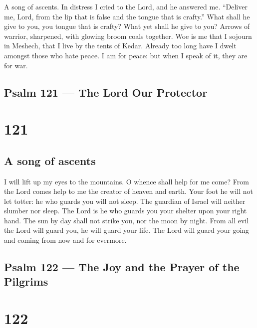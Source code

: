 A song of ascents.  In distress I cried to the Lord, and he
answered me.  ``Deliver me, Lord, from the lip that is false
and the tongue that is crafty.''  What shall he give to you,
you tongue that is crafty? What yet shall he give to you? 
Arrows of warrior, sharpened, with glowing broom coals together.
 Woe is me that I sojourn in Meshech, that I live by the
tents of Kedar.  Already too long have I dwelt amongst those
who hate peace.  I am for peace: but when I speak of it,
they are for war.

\hypertarget{psalm-121-the-lord-our-protector}{%
\subsection{Psalm 121 --- The Lord Our
Protector}\label{psalm-121-the-lord-our-protector}}

\hypertarget{section-120}{%
\section{121}\label{section-120}}

\hypertarget{a-song-of-ascents}{%
\subsection{A song of ascents}\label{a-song-of-ascents}}

 I will lift up my eyes to the mountains. O whence shall
help for me come?  From the Lord comes help to me the
creator of heaven and earth.  Your foot he will not let
totter: he who guards you will not sleep.  The guardian of
Israel will neither slumber nor sleep.  The Lord is he who
guards you your shelter upon your right hand.  The sun by
day shall not strike you, nor the moon by night.  From all
evil the Lord will guard you, he will guard your life.  The
Lord will guard your going and coming from now and for evermore.

\hypertarget{psalm-122-the-joy-and-the-prayer-of-the-pilgrims}{%
\subsection{Psalm 122 --- The Joy and the Prayer of the
Pilgrims}\label{psalm-122-the-joy-and-the-prayer-of-the-pilgrims}}

\hypertarget{section-121}{%
\section{122}\label{section-121}}

